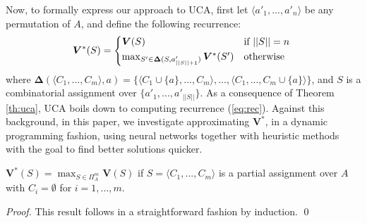 \documentclass[runningheads]{llncs}
\newcounter{ctTODO}
\newcommand{\TODO}[1]{%
	\textcolor{red}{\textbf{TODO(\arabic{ctTODO}): } #1}%
	\addtocounter{ctTODO}{1}%
}
\begin{document}
	
	Now, to formally express our approach to UCA, first let $\langle a'_1,...,a'_n \rangle$ be any permutation of $A$, and define the following recurrence:
	\begin{equation}\label{eq:rec} 
	\bm{V}^*(S) = 
	\begin{cases*} 
	\bm{V}(S ) & if $||S|| = n$ \\ 
	\max_{S' \in \bm{\Delta} (S, a'_{||S|| + 1})}\bm{V}^*(S') & otherwise
	\end{cases*}
	\end{equation}
	where $\bm{\Delta}(\langle C_1,...,C_m \rangle ,a) = \{ \langle C_1 \cup \{a\},...,C_m \rangle,...,\langle C_1,...,C_m \cup \{a\} \rangle \}$, and $S$ is a combinatorial assignment over $\{a'_1,...,a'_{||S||}\}$. As a consequence of Theorem \ref{th:uca}, UCA boils down to computing recurrence (\ref{eq:rec}). Against this background, in this paper, we investigate approximating $\bm{V}^*$, in a dynamic programming fashion, using neural networks together with heuristic methods with the goal to find better solutions quicker.
	
	
	\begin{theorem}\label{th:uca}
		$\bm{V}^*(S) = \max_{S \in \Pi^m_A}\bm{V}(S)$ if $S = \langle C_1,...,C_m \rangle$ is a partial assignment over $A$ with $C_i = \emptyset$ for $i = 1,...,m$.
	\end{theorem}
	\begin{proof}
		This result follows in a straightforward fashion by induction. \qed
	\end{proof}
	
	
	
	
\end{document}
